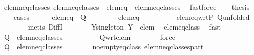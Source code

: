 \begin{isabellebody}
\ elem{\isacharunderscore}neq{\isacharunderscore}classes{\isacharcolon}\ {\isachardoublequoteopen}{\isacharquery}elem{\isacharunderscore}neq{\isacharunderscore}classes\ {\isacharminus}\ {\isacharbraceleft}{\isacharquery}elem{\isacharunderscore}eq{\isacharbraceright}\ {\isacharequal}\ {\isacharquery}elem{\isacharunderscore}neq{\isacharunderscore}classes{\isachardoublequoteclose}\ \isamarkupfalse%
\ fastforce\isanewline
\isanewline
\ \ \isamarkupfalse%
\ {\isacharquery}thesis\isanewline
\ \ \isamarkupfalse%
\ cases\isanewline
\ \ \ \ \isamarkupfalse%
\ {\isachardoublequoteopen}{\isacharquery}elem{\isacharunderscore}eq\ {\isasymnotin}\ {\isacharquery}Q{\isachardoublequoteclose}\ \isanewline
\ \ \ \ \isamarkupfalse%
\ \isamarkupfalse%
\ {\isachardoublequoteopen}{\isacharquery}elem{\isacharunderscore}eq\ {\isasymin}\ {\isacharbraceleft}{\isacharbraceleft}{\isacharbraceright}{\isacharbraceright}{\isachardoublequoteclose}\isanewline
\ \ \ \ \ \ \isamarkupfalse%
\ elem{\isacharunderscore}eq{\isacharunderscore}wrt{\isacharunderscore}P\ Q{\isacharunderscore}unfolded\isanewline
\ \ \ \ \ \ \isamarkupfalse%
\ {\isacharparenleft}metis\ DiffI{\isacharparenright}\isanewline
\ \ \ \ \isamarkupfalse%
\ \isamarkupfalse%
\ Y{\isacharunderscore}singleton{\isacharcolon}\ {\isachardoublequoteopen}Y\ {\isacharequal}\ {\isacharbraceleft}elem{\isacharbraceright}{\isachardoublequoteclose}\ \isamarkupfalse%
\ elem{\isacharunderscore}eq{\isacharunderscore}class\ \isamarkupfalse%
\ fast\isanewline
\ \ \ \ \isamarkupfalse%
\ \isamarkupfalse%
\ {\isachardoublequoteopen}{\isacharquery}Q\ {\isacharequal}\ {\isacharquery}elem{\isacharunderscore}neq{\isacharunderscore}classes\ {\isacharminus}\ {\isacharbraceleft}{\isacharbraceleft}{\isacharbraceright}{\isacharbraceright}{\isachardoublequoteclose}\isanewline
\ \ \ \ \ \ \isamarkupfalse%
\ Q{\isacharunderscore}wrt{\isacharunderscore}elem\isanewline
\ \ \ \ \ \ \isamarkupfalse%
\ force\isanewline
\ \ \ \ \isamarkupfalse%
\ \isamarkupfalse%
\ {\isachardoublequoteopen}{\isacharquery}Q\ {\isacharequal}\ {\isacharquery}elem{\isacharunderscore}neq{\isacharunderscore}classes{\isachardoublequoteclose}\isanewline
\ \ \ \ \ \ \isamarkupfalse%
\ no{\isacharunderscore}empty{\isacharunderscore}eq{\isacharunderscore}class\ elem{\isacharunderscore}neq{\isacharunderscore}classes{\isacharunderscore}part\isanewline

\end{isabellebody}
